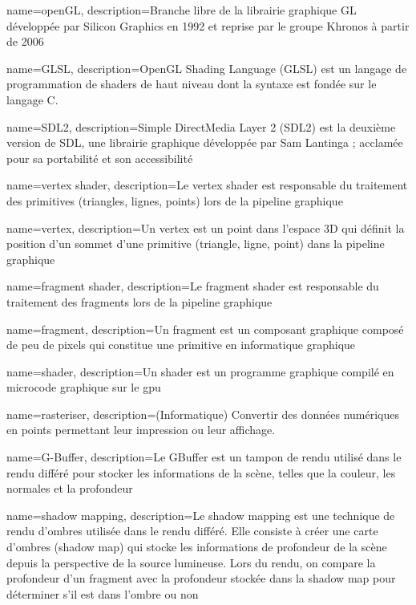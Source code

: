 
{
    name=openGL,
    description={Branche libre de la librairie graphique GL développée par
    Silicon Graphics en 1992 et reprise par le groupe Khronos à partir de
    2006}
}

{
    name=GLSL,
    description={OpenGL Shading Language (GLSL) est un langage de
    programmation de shaders de haut niveau dont la syntaxe est fondée sur
    le langage C.}
}

{
    name=SDL2,
    description={Simple DirectMedia Layer 2 (SDL2) est la deuxième version de
    SDL, une librairie graphique développée par Sam Lantinga ; acclamée pour
    sa portabilité et son accessibilité}
}

{
    name=vertex shader,
    description={Le \gls{vertex} shader est responsable du traitement des
    primitives (triangles, lignes, points) lors de la pipeline graphique}
}

{
    name=vertex,
    description={Un vertex est un point dans l'espace 3D qui définit la
    position d'un sommet d'une primitive (triangle, ligne, point) dans la
    pipeline graphique}
}

{
    name=fragment shader,
    description={Le fragment shader est responsable du traitement des
    fragments lors de la pipeline graphique}
}

{
    name=fragment,
    description={Un fragment est un composant graphique composé de peu de
    pixels qui constitue une primitive en informatique graphique}
}

{
    name=shader,
    description={Un shader est un programme graphique compilé en microcode
    graphique sur le \gls{gpu}}
}

{
    name=rasteriser,
    description={(Informatique) Convertir des données numériques en points
    permettant leur impression ou leur affichage. \cite{lalanguefrancaise}}
}

{
    name=G-Buffer,
    description={Le GBuffer est un tampon de rendu utilisé dans le rendu
    différé pour stocker les informations de la scène, telles que la couleur,
    les normales et la profondeur}
}

{
    name=shadow mapping,
    description={Le shadow mapping est une technique de rendu d'ombres
    utilisée dans le rendu différé. Elle consiste à créer une carte d'ombres
    (shadow map) qui stocke les informations de profondeur de la scène
    depuis la perspective de la source lumineuse. Lors du rendu, on
    compare la profondeur d'un fragment avec la profondeur stockée dans la
    shadow map pour déterminer s'il est dans l'ombre ou non}
}

